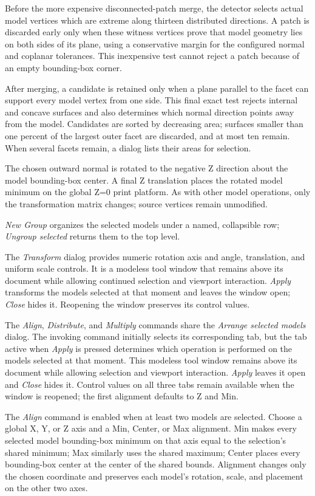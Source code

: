 Before the more expensive disconnected-patch merge, the detector selects actual
model vertices which are extreme along thirteen distributed directions. A patch
is discarded early only when these witness vertices prove that model geometry
lies on both sides of its plane, using a conservative margin for the configured
normal and coplanar tolerances. This inexpensive test cannot reject a patch
because of an empty bounding-box corner.

After merging, a candidate is retained only when a plane parallel to the facet
can support every model vertex from one side. This final exact test rejects
internal and concave surfaces and also determines which normal direction points
away from the model. Candidates
are sorted by decreasing area; surfaces smaller than one percent of the largest
outer facet are discarded, and at most ten remain. When several facets remain,
a dialog lists their areas for selection.

The chosen outward normal is rotated to the negative Z direction about the
model bounding-box center. A final Z translation places the rotated model
minimum on the global Z=0 print platform. As with other model operations, only
the transformation matrix changes; source vertices remain unmodified.

\emph{New Group} organizes the selected models under a named, collapsible row;
\emph{Ungroup selected} returns them to the top level.

\hypertarget{transform-dialog}{}The \emph{Transform} dialog provides numeric
rotation axis and angle, translation, and uniform scale controls. It is a
modeless tool window that remains above its document while allowing continued
selection and viewport interaction. \emph{Apply} transforms the models selected
at that moment and leaves the window open; \emph{Close} hides it. Reopening the
window preserves its control values.

The \emph{Align}, \emph{Distribute}, and \emph{Multiply} commands share the \emph{Arrange selected
models} dialog. The invoking command initially selects its corresponding tab,
but the tab active when \emph{Apply} is pressed determines which operation is
performed on the models selected at that moment. This modeless tool window
remains above its document while allowing selection and viewport interaction.
\emph{Apply} leaves it open and \emph{Close} hides it. Control values on all
three tabs remain available when the window is reopened; the first alignment
defaults to Z and Min.

\hypertarget{align-dialog}{}The \emph{Align} command is enabled when at least two
models are selected. Choose a global X, Y, or Z axis and a Min, Center, or Max
alignment. Min makes every selected model bounding-box minimum on
that axis equal to the selection's shared minimum; Max similarly uses the
shared maximum; Center places every bounding-box center at the center of the
shared bounds. Alignment changes only the chosen coordinate and preserves each
model's rotation, scale, and placement on the other two axes.

